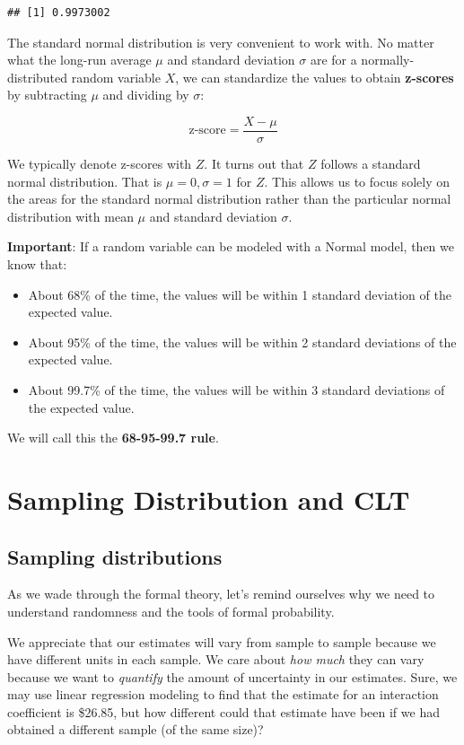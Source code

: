 \documentclass[]{book}
\providecommand{\tightlist}{%
  \setlength{\itemsep}{0pt}\setlength{\parskip}{0pt}}
\begin{document}
\begin{verbatim}
## [1] 0.9973002
\end{verbatim}

The standard normal distribution is very convenient to work with. No matter what the long-run average \(\mu\) and standard deviation \(\sigma\) are for a normally-distributed random variable \(X\), we can standardize the values to obtain \textbf{z-scores} by subtracting \(\mu\) and dividing by \(\sigma\):

\[\text{z-score} = \frac{X - \mu}{\sigma}\]

We typically denote z-scores with \(Z\). It turns out that \(Z\) follows a standard normal distribution. That is \(\mu=0, \sigma=1\) for \(Z\). This allows us to focus solely on the areas for the standard normal distribution rather than the particular normal distribution with mean \(\mu\) and standard deviation \(\sigma\).

\textbf{Important}: If a random variable can be modeled with a Normal model, then we know that:

\begin{itemize}
\tightlist
\item
  About 68\% of the time, the values will be within 1 standard deviation of the expected value.
\item
  About 95\% of the time, the values will be within 2 standard deviations of the expected value.
\item
  About 99.7\% of the time, the values will be within 3 standard deviations of the expected value.
\end{itemize}

We will call this the \textbf{68-95-99.7 rule}.

\hypertarget{sampling-distribution-and-clt}{%
\section{Sampling Distribution and CLT}\label{sampling-distribution-and-clt}}

\hypertarget{sampling-distributions}{%
\subsection{Sampling distributions}\label{sampling-distributions}}

As we wade through the formal theory, let's remind ourselves why we need to understand randomness and the tools of formal probability.

We appreciate that our estimates will vary from sample to sample because we have different units in each sample. We care about \emph{how much} they can vary because we want to \emph{quantify} the amount of uncertainty in our estimates. Sure, we may use linear regression modeling to find that the estimate for an interaction coefficient is \$26.85, but how different could that estimate have been if we had obtained a different sample (of the same size)?
\end{document}
